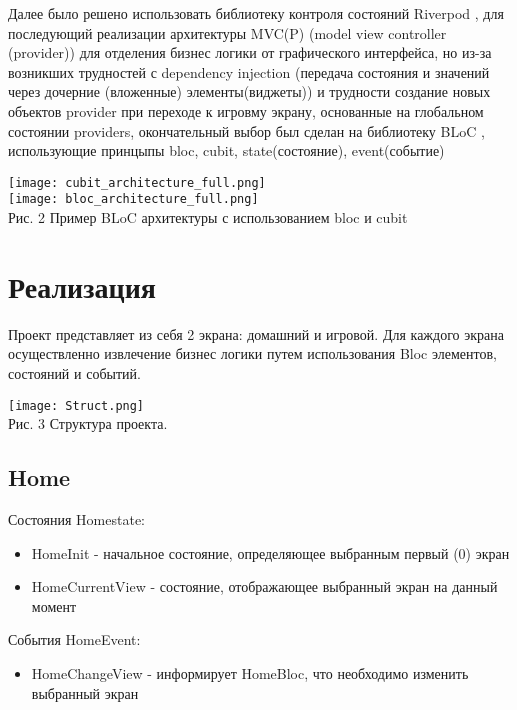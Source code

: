 \documentclass[14pt, oneside]{altsu-report}
\begin{document}
Далее было решено использовать библиотеку контроля состояний Riverpod \cite{riverpod}, для последующий реализации архитектуры MVC(P) (model view controller (provider)) \cite{mvc} для отделения бизнес логики от графического интерфейса, но из-за возникших трудностей с dependency injection (передача состояния и значений через дочерние (вложенные) элементы(виджеты)) и трудности создание новых объектов provider при переходе к игровму экрану, основанные на глобальном состоянии providers, окончательный выбор был сделан на библиотеку BLoC \cite{bloc}, использующие принцыпы bloc, cubit, state(состояние), event(событие)

\begin{center}
\texttt{[image: cubit\_architecture\_full.png]}\\
\vspace{20pt}
\texttt{[image: bloc\_architecture\_full.png]}\\
   
Рис. 2 Пример BLoC архитектуры с использованием bloc и cubit
\end{center}

\section{Реализация}
Проект представляет из себя 2 экрана: домашний и игровой. Для каждого экрана осуществленно извлечение бизнес логики путем использования Bloc элементов, состояний и событий.

\begin{center}
\texttt{[image: Struct.png]}\\
   
Рис. 3 Структура проекта. 
\end{center}

\subsection*{Home}
Состояния Homestate:
\begin{itemize}
  \item HomeInit - начальное состояние, определяющее выбранным первый (0) экран
  \item HomeCurrentView - состояние, отображающее выбранный экран на данный момент
\end{itemize}

События HomeEvent:
\begin{itemize}
  \item HomeChangeView - информирует HomeBloc, что необходимо изменить выбранный экран
\end{itemize}
\end{document}
